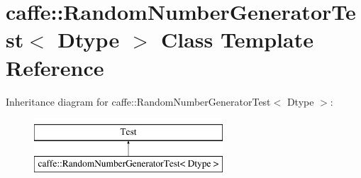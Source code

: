 \hypertarget{classcaffe_1_1_random_number_generator_test}{\section{caffe\+:\+:Random\+Number\+Generator\+Test$<$ Dtype $>$ Class Template Reference}
\label{classcaffe_1_1_random_number_generator_test}
}
Inheritance diagram for caffe\+:\+:Random\+Number\+Generator\+Test$<$ Dtype $>$\+:\begin{figure}[H]
\begin{center}
\leavevmode
\includegraphics[height=2.000000cm]{classcaffe_1_1_random_number_generator_test}
\end{center}
\end{figure}
